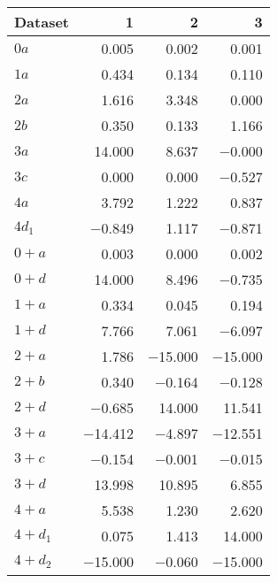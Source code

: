 \begin{tabular}{lrrr}
\toprule
 Dataset   &       1 &       2 &       3 \\
\midrule
 $0 a$     &   \num{0.005} &   \num{0.002} &   \num{0.001} \\
 $1 a$     &   \num{0.434} &   \num{0.134} &   \num{0.110} \\
 $2 a$     &   \num{1.616} &   \num{3.348} &   \num{0.000} \\
 $2 b$     &   \num{0.350} &   \num{0.133} &   \num{1.166} \\
 $3 a$     &  \num{14.000} &   \num{8.637} &  \num{-0.000} \\
 $3 c$     &   \num{0.000} &   \num{0.000} &  \num{-0.527} \\
 $4 a$     &   \num{3.792} &   \num{1.222} &   \num{0.837} \\
 $4 d_1$   &  \num{-0.849} &   \num{1.117} &  \num{-0.871} \\
 $0+ a$    &   \num{0.003} &   \num{0.000} &   \num{0.002} \\
 $0+ d$    &  \num{14.000} &   \num{8.496} &  \num{-0.735} \\
 $1+ a$    &   \num{0.334} &   \num{0.045} &   \num{0.194} \\
 $1+ d$    &   \num{7.766} &   \num{7.061} &  \num{-6.097} \\
 $2+ a$    &   \num{1.786} & \num{-15.000} & \num{-15.000} \\
 $2+ b$    &   \num{0.340} &  \num{-0.164} &  \num{-0.128} \\
 $2+ d$    &  \num{-0.685} &  \num{14.000} &  \num{11.541} \\
 $3+ a$    & \num{-14.412} &  \num{-4.897} & \num{-12.551} \\
 $3+ c$    &  \num{-0.154} &  \num{-0.001} &  \num{-0.015} \\
 $3+ d$    &  \num{13.998} &  \num{10.895} &   \num{6.855} \\
 $4+ a$    &   \num{5.538} &   \num{1.230} &   \num{2.620} \\
 $4+ d_1$  &   \num{0.075} &   \num{1.413} &  \num{14.000} \\
 $4+ d_2$  & \num{-15.000} &  \num{-0.060} & \num{-15.000} \\
\bottomrule
\end{tabular}